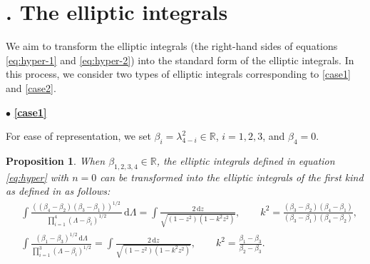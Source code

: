 \documentclass[11pt,reqno]{amsart}
\newcommand{\dd}{\mathrm{d}}
\newtheorem{prop}{Proposition}
\numberwithin{equation}{section}
\begin{document}
\section{\appendixname. The elliptic integrals}\label{appendix:map}

\setcounter{equation}{0}
\setcounter{define}{0}
\setcounter{prop}{0}
\setcounter{lemma}{0}

\renewcommand\theequation{\Alph{section}.\arabic{equation}}
\renewcommand\thedefine{\Alph{section}.\arabic{define}}
\renewcommand\theprop{\Alph{section}.\arabic{prop}}
\renewcommand\thelemma{\Alph{section}.\arabic{lemma}}


We aim to transform the elliptic integrals (the right-hand sides of equations \eqref{eq:hyper-1} and \eqref{eq:hyper-2}) into the standard form of the elliptic integrals.
In this process, we consider two types of elliptic integrals corresponding to  \ref{case1} and \ref{case2}.

\vspace{0.1cm}
\noindent $\bullet$\quad
\textbf{\large \ref{case1}}

For ease of representation, we set $\beta_i=\lambda_{4-i}^2\in \mathbb{R}$, $i=1,2,3$, and $\beta_4=0$.

\begin{prop}\label{prop:elliptic-int-1}
	When $\beta_{1,2,3,4}\in \mathbb{R}$, the elliptic integrals defined in equation \eqref{eq:hyper} with $n=0$ can be transformed into the elliptic integrals of the first kind as defined in  as follows:
	\begin{subequations}\label{eq:elliptic-int-1}
		\begin{align}
			&\int \frac{((\beta_4-\beta_2)(\beta_3-\beta_1))^{1/2} \,}{\prod_{i=1}^{4}(\Lambda-\beta_i)^{1/2}}\, \dd \Lambda
			= \int\frac{2 \, \dd z }{\sqrt{(1-z^2)(1-k^2z^2)}},  \qquad 	k^2=\frac{(\beta_3-\beta_2)(\beta_4-\beta_1)}{(\beta_3-\beta_1)(\beta_4-\beta_2)}, \label{eq:elliptic-int-1-4}\\
			& \int\frac{(\beta_1-\beta_3)^{1/2} \, \dd \Lambda}{\prod_{i=1}^{3}(\Lambda-\beta_i)^{1/2}} = \int\frac{2 \, \dd z}{\sqrt{(1-z^2)(1-k^2z^2)}}, \qquad
			k^2=\frac{\beta_1-\beta_3}{\beta_2-\beta_3}. \label{eq:elliptic-int-1-3}
		\end{align}	
	\end{subequations}
\end{prop}
\end{document}
